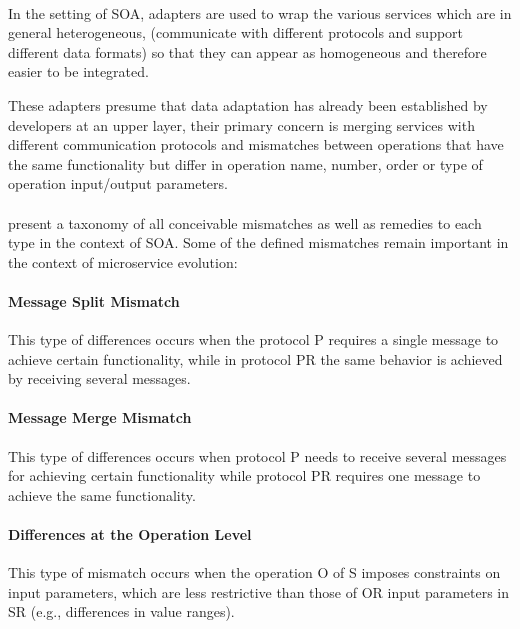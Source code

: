 \paragraph{}

In the setting of SOA, adapters are used to wrap the various services which are in general heterogeneous,
(communicate with different protocols and support different data formats) so that they can appear as homogeneous and therefore easier to be integrated.

These adapters presume that data adaptation has already been established by developers at an upper layer,
their primary concern is merging services with different communication protocols and mismatches between operations that have the
same functionality but differ in operation name, number, order or type of operation input/output parameters.

\paragraph{}

\citeauthor{adaptersWebServices} \cite{adaptersWebServices} present a taxonomy of all conceivable mismatches as well as remedies to each type in the context of SOA.
Some of the defined mismatches remain important in the context of microservice evolution:

\paragraph{Message Split Mismatch}
This type of differences occurs when the protocol P requires a single message to achieve certain functionality,
while in protocol PR the same behavior is achieved by receiving several messages.

\paragraph{Message Merge Mismatch}
This type of differences occurs when protocol P needs to receive several messages for achieving certain
functionality while protocol PR requires one message to achieve the same functionality.

\paragraph{Differences at the Operation Level}
This type of mismatch occurs when the operation O of S imposes constraints on input parameters,
which are less restrictive than those of OR input parameters in SR (e.g., differences in value ranges).

